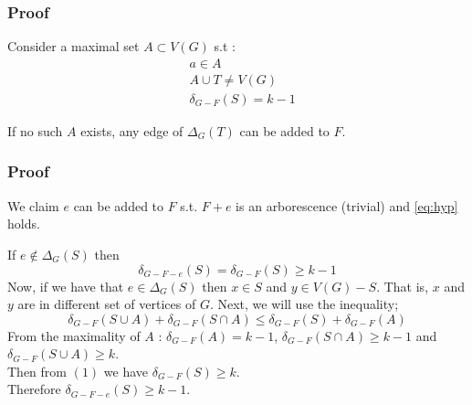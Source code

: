 \documentclass[8pt]{beamer}
\begin{document}
\begin{frame}
\frametitle{Proof}
Consider a maximal set $A\subset V(G)$ s.t :
\begin{subequations}
\begin{align}
    & a \in A \\ 
    & A \cup T \ne V(G) \\ 
    & \delta_{G-F}(S) = k - 1 
\end{align}
\end{subequations}

If no such $A$ exists, any edge of $\Delta_G(T)$ can be added to $F$.

\end{frame}

\begin{frame}
\frametitle{Proof}
We claim $e$ can be added to $F$ s.t. $F + e$ is an arborescence (trivial) and \eqref{eq:hyp} holds.


If $e\not\in \Delta_G(S)$ then $$\delta_{G-F-e}(S) = \delta_{G-F}(S) \ge k-1$$
Now, if we have that $e\in \Delta_G(S)$ then $x\in S$ and $y\in V(G)-S$. That is, $x$ and $y$ are in different set of vertices of $G$. Next, we will use the inequality; 
\begin{equation}\delta_{G-F}(S\cup A) + \delta_{G-F}(S\cap A) \le \delta_{G-F}(S) + \delta_{G-F}(A)\end{equation}
From the maximality of $A$ : $\delta_{G-F}(A)=k-1$, $\delta_{G-F}(S\cap A) \ge k-1$ and $\delta_{G-F}(S\cup A) \ge k$.\\
Then from $(1)$ we have $\delta_{G-F}(S) \ge k$.\\
Therefore $\delta_{G-F-e}(S) \ge k-1$. 
\eofproof
\end{frame}
\end{document}

